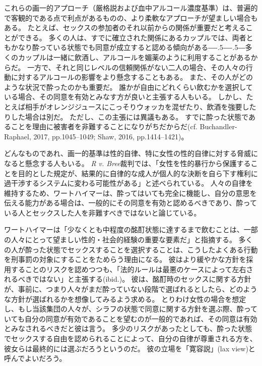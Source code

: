 \documentclass[paper=a4,book,openany]{jlreq}
\def\DDASH{―\kern-.5\zw―\kern-.5\zw―} %
\begin{document}
これらの画一的アプローチ（厳格説および血中アルコール濃度基準）は、普遍的で客観的である点で利点があるものの、より柔軟なアプローチが望ましい場合もある。
たとえば、セックスの参加者のそれ以前からの関係が重要だと考えることができる。
多くの人は、すでに確立された関係にあるカップルでは、両者ともかなり酔っている状態でも同意が成立すると認める傾向がある{\DDASH}多くのカップルは一緒に飲酒し、アルコールを媚薬のように利用することがあるからだ。
一方で、それと同じレベルの信頼関係がない二人の場合、その人々の行動に対するアルコールの影響をより懸念することもある。
また、その人がどのような状況で酔ったのかも重要だ。
誰かが自由にどれくらい飲むかを選択している場合、その同意を有効とみなす方が良いと主張する人もいる。
しかし、たとえば相手がオレンジジュースにこっそりウォッカを混ぜたり、飲酒を強要したりした場合は別だ。
ただし、この主張には異議もある。
すでに酔った状態であることを理由に被害者を非難することになりがちだからだ(cf. Buchandler-Raphael, 2017, pp.1045--1049; Shaw, 2016, pp.1414--1421)\nocite{buchhandler-raphael17:_conun_volun_intox_sex}\nocite{shaw16:_title_ix_sexual_assaul_issue_effec_consen}。

どんなものであれ、画一的基準は性的自律、特に女性の性的自律に対する脅威になると懸念する人もいる。
\emph{R v. Bree}裁判では、「女性を性的暴行から保護することを目的とした規定が、結果的に自律的な成人が個人的な決断を自ら下す権利に過干渉するシステムに変わる可能性がある」と述べられている。
人々の自律を維持するため、ワートハイマーは、酔ってはいても完全に機能し、自分の意思を伝える能力がある場合は、一般的にその同意を有効と認めるべきであり、酔っている人とセックスした人を非難すべきではないと論じている。

ワートハイマーは「少なくとも中程度の酩酊状態に達するまで飲むことは、一部の人々にとって望ましい性的・社会的経験の重要な要素だ」と指摘する\citep[p.251]{wertheimer03:_consen_sexual_relat}。
多くの人が酔った状態でセックスすることを選択することは、こうしたよくある行動を刑事罰の対象にすることをためらう理由になる。
彼はより緩やかな方針を採用することのリスクを認めつつも、「法的ルールは最悪のケースによって左右されるべきではない」と主張する(ibid.)。
彼は、酩酊時のセックスに関する方針が、事前に、つまり人々がまだ酔っていない段階で選ばれるとしたら、どのような方針が選ばれるかを想像してみるよう求める。
とりわけ女性の場合を想定し、もし当該集団の人々が、シラフの状態で同意に関する方針を選ぶ際、酔っていても自分の同意が有効であることを望むのが一般的であれば、その同意は有効とみなされるべきだと彼は言う。
多少のリスクがあったとしても、酔った状態でセックスする自由を認められることによって、自分の自律が尊重される方を、彼女らは最終的には選ぶだろうというのだ。
彼の立場を「寛容説」(lax view)と呼んでよいだろう。
\end{document}
